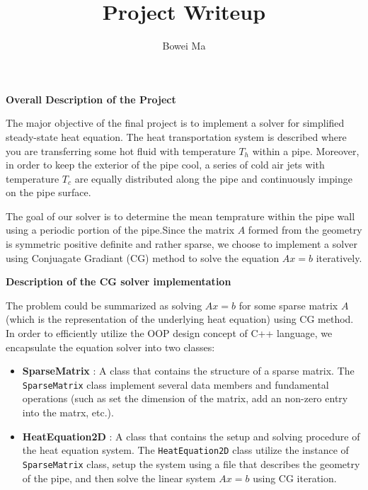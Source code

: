 \documentclass[11pt]{article} %
\title{Project  Writeup}
\author{Bowei Ma}
\begin{document}
\maketitle

\noindent
\textbf{\Large{Overall Description of the Project\\}}

The major objective of the final project is to implement a solver for simplified steady-state heat equation. The heat transportation system is described where you are transferring some hot fluid with temperature $T_{h}$ within a pipe. Moreover, in order to keep the exterior of the pipe cool, a series of cold air jets with temperature $T_{c}$ are equally distributed along the pipe and continuously impinge on the pipe surface.

The goal of our solver is to determine the mean temprature within the pipe wall using a periodic portion of the pipe.Since the matrix $A$ formed from the geometry is symmetric positive definite and rather sparse, we choose to implement a solver using Conjuagate Gradiant (CG) method to solve the equation $Ax = b$ iteratively.

\bigskip
\noindent
\textbf{\Large{Description of the CG solver implementation\\}}
\bigskip

The problem could be summarized as solving $Ax = b$ for some sparse matrix $A$ (which is the representation of the underlying heat equation) using CG method. In order to efficiently utilize the OOP design concept of C++ language, we encapsulate the equation solver into two classes:

\begin{itemize}

\item \textbf{SparseMatrix} : A class that contains the structure of a sparse matrix. The \texttt{SparseMatrix} class implement several data members and fundamental operations (such as set the dimension of the matrix, add an non-zero entry into the matrx, etc.).

\item \textbf{HeatEquation2D} : A class that contains the setup and solving procedure of the heat equation system. The \texttt{HeatEquation2D} class utilize the instance of  \texttt{SparseMatrix} class, setup the system using a file that describes the geometry of the pipe, and then solve the linear system $Ax = b$ using CG iteration.

\end{itemize}
\end{document}
